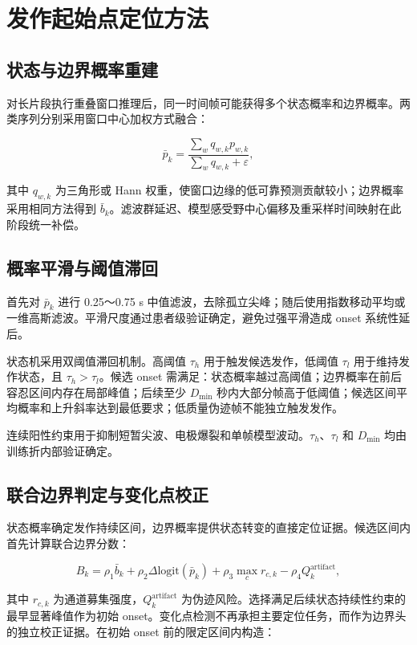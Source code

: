 
\clearpage
\section{发作起始点定位方法}

\subsection{状态与边界概率重建}

对长片段执行重叠窗口推理后，同一时间帧可能获得多个状态概率和边界概率。两类序列分别采用窗口中心加权方式融合：

$$
\bar p_k=
\frac{\sum_w q_{w,k}p_{w,k}}
{\sum_w q_{w,k}+\varepsilon},
$$

其中 $q_{w,k}$ 为三角形或 Hann 权重，使窗口边缘的低可靠预测贡献较小；边界概率采用相同方法得到 $\bar b_k$。滤波群延迟、模型感受野中心偏移及重采样时间映射在此阶段统一补偿。

\subsection{概率平滑与阈值滞回}

首先对 $\bar p_k$ 进行 0.25～0.75 s 中值滤波，去除孤立尖峰；随后使用指数移动平均或一维高斯滤波。平滑尺度通过患者级验证确定，避免过强平滑造成 onset 系统性延后。

状态机采用双阈值滞回机制。高阈值 $\tau_h$ 用于触发候选发作，低阈值 $\tau_l$ 用于维持发作状态，且 $\tau_h>\tau_l$。候选 onset 需满足：状态概率越过高阈值；边界概率在前后容忍区间内存在局部峰值；后续至少 $D_{\min}$ 秒内大部分帧高于低阈值；候选区间平均概率和上升斜率达到最低要求；低质量伪迹帧不能独立触发发作。

连续阳性约束用于抑制短暂尖波、电极爆裂和单帧模型波动。$\tau_h$、$\tau_l$ 和 $D_{\min}$ 均由训练折内部验证确定。

\subsection{联合边界判定与变化点校正}

状态概率确定发作持续区间，边界概率提供状态转变的直接定位证据。候选区间内首先计算联合边界分数：

$$
B_k=\rho_1\bar b_k
+\rho_2\Delta\mathrm{logit}(\bar p_k)
+\rho_3\max_c r_{c,k}
-\rho_4Q_k^{\mathrm{artifact}},
$$

其中 $r_{c,k}$ 为通道募集强度，$Q_k^{\mathrm{artifact}}$ 为伪迹风险。选择满足后续状态持续性约束的最早显著峰值作为初始 onset。变化点检测不再承担主要定位任务，而作为边界头的独立校正证据。在初始 onset 前的限定区间内构造：


